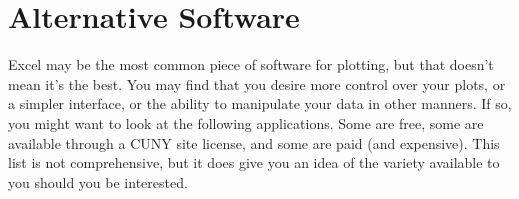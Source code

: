 \documentclass[nobib,nofonts,nols,nohyper]{tufte-handout}
\begin{document}

\section{Alternative Software} %
\label{alternative-software}

Excel may be the most common piece of software for plotting, but that doesn't mean it's the best. 
You may find that you desire more control over your plots, or a simpler interface, or the ability to manipulate your data in other manners. 
If so, you might want to look at the following applications. 
Some are free, some are available through a CUNY site license, and some are paid (and expensive). 
This list is not comprehensive, but it does give you an idea of the variety available to you should you be interested.
\end{document}
